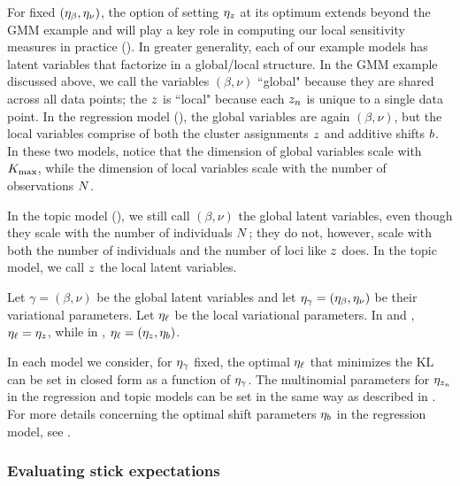 For fixed $(\eta_{\beta}, \eta_{\nu})$, the option of setting $\eta_{z}$ at its optimum
extends beyond the GMM example and will play
a key role in computing our local sensitivity
measures in practice ().
In greater generality, each of our example models
has latent variables that factorize in a global/local structure.
In the GMM example discussed above, we call the variables $(\beta, \nu)$ ``global"
because they are shared across all data points; the $z$ is ``local"
because each $z_n$ is unique to a single data point.
In the regression model (),
the global variables are again $(\beta, \nu)$,
but the local variables comprise of both the cluster assignments $z$ and additive shifts $b$.
In these two models, notice that the dimension of global variables scale with ${K_{\mathrm{max}}}$, while
the dimension of local variables scale with the number of observations $N$.

In the topic model (),
we still call $(\beta, \nu)$ the global latent variables, even though they scale
with the number of individuals $N$;
they do not, however, scale with both the number of individuals and the number of loci
like $z$ does. In the topic model, we call $z$ the local latent variables.

Let $\gamma = (\beta,\nu)$ be the global latent variables
and let $\eta_{\gamma} = (\eta_{\beta}, \eta_{\nu})$ be their variational parameters.
Let $\eta_{\ell}$ be the local variational parameters. In  and
, $\eta_{\ell} = \eta_{z}$, while
in , $\eta_{\ell} = (\eta_{z}, \eta_b)$.

In each model we consider, for $\eta_{\gamma}$ fixed, the optimal $\eta_{\ell}$ that minimizes
the $\mathrm{KL}$ can be set in closed form as a function of $\eta_{\gamma}$.
The multinomial parameters for $\eta_{z_n}$ in the regression and topic models
can be set in the same way as described in .
For more details concerning the optimal shift parameters $\eta_b$
in the regression model, see .




\subsubsection{Evaluating stick expectations}

